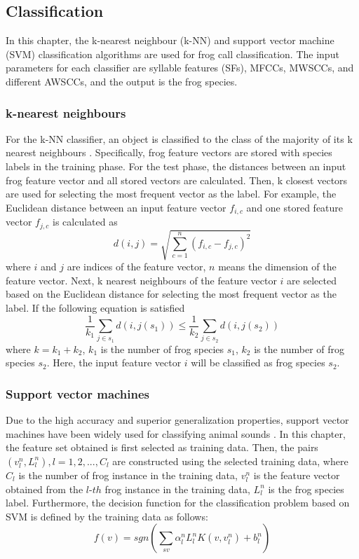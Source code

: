\subsection{Classification}
In this chapter, the k-nearest neighbour (k-NN) and support vector machine (SVM) classification algorithms are used for frog call classification. The input parameters for each classifier are syllable features (SFs), MFCCs, MWSCCs, and different AWSCCs, and the output is the frog species.

\subsubsection{k-nearest neighbours}
For the k-NN classifier, an object is classified to the class of the majority of its k nearest neighbours \citep{huang2009frog}. Specifically, frog feature vectors are stored with species labels in the training phase. For the test phase, the distances between an input frog feature vector and all stored vectors are calculated. Then, k closest vectors are used for selecting the most frequent vector as the label. For example, the Euclidean distance between an input feature vector $f_{i,c}$ and one stored feature vector $f_{j,c}$ is calculated as
\begin{equation}
d(i,j) = \sqrt{\sum_{c=1}^{n}(f_{i,c}-f_{j,c})^2}
\end{equation}
\noindent where $i$ and $j$ are indices of the feature vector, $n$ means the dimension of the feature vector. 
Next, k nearest neighbours of the feature vector $i$ are selected based on the Euclidean distance for selecting the most frequent vector as the label. If the following equation is satisfied
\begin{equation}
\frac{1}{k_{1}}\sum_{j \in s_{1}} d(i,j(s_{1})) \leq \frac{1}{k_{2}}\sum_{j \in s_{2}}d(i,j(s_{2})) 
\end{equation}
\noindent where $k=k_{1}+k_{2}$, $k_{1}$ is the number of frog species $s_{1}$, $k_{2}$ is the number of frog species $s_{2}$. Here, the input feature vector $i$ will be classified as frog species $s_{2}$.

\subsubsection{Support vector machines}
Due to the high accuracy and superior generalization properties, support vector machines have been widely used for classifying animal sounds \citep{huang2009frog, acevedo2009automated}. In this chapter, the feature set obtained is first selected as training data. Then, the pairs $(v_{l}^{n},L_{l}^{n}), l=1,2,..., C_{l}$ are constructed using the selected training data, where $C_{l}$ is the number of frog instance in the training data, $v_{l}^{n}$ is the feature vector obtained from the $l$-$th$ frog instance in the training data, $L_{l}^{n}$ is the frog species label. Furthermore, the decision function for the classification problem based on SVM \citep{cortes1995support} is defined by the training data as follows:
\begin{equation}
f(v) = sgn(\sum_{sv}\alpha_{l}^{n}L_{l}^{n}K(v,v_{l}^{n})+b_{l}^{n})
\end{equation}

